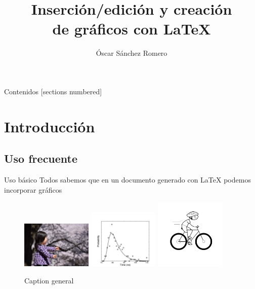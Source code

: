 \documentclass[10pt]{beamer}
\title{Inserción/edición y creación \\ de 
gráficos con \LaTeX{}}
\date{}
\author{Óscar Sánchez Romero}
\institute{Dpto. Matemática Aplicada, UGR}
\begin{document}
\maketitle

\begin{frame}{Contenidos}
  [sections numbered]
  \tableofcontents[hideallsubsections]
\end{frame}

\section{Introducción}

\subsection{Uso frecuente}
\begin{frame}[fragile]{Uso básico}
Todos sabemos que en un documento generado con \LaTeX{} podemos incorporar  gráficos  
\begin{figure}[h]
\includegraphics[width=0.3\textwidth]{../graficos/sorpresa.jpg} 
\includegraphics[width=0.3\textwidth]{../graficos/fig_9Vis.pdf}
\includegraphics[width=0.3\textwidth]{../graficos/ciclista.png}
\caption{Caption general}
\label{figGeneral}
\end{figure}
\end{frame}
\end{document}
